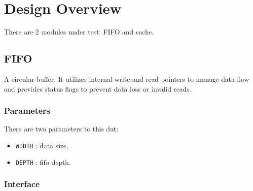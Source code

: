 \chapter{Design Overview} 
\label{cha:design_overview}

There are 2 modules under test: FIFO and cache.

\section{FIFO}

A circular buffer.
It utilizes internal write and read pointers to manage data flow and provides status flags to prevent data loss or invalid reads.

\subsection{Parameters}

There are two parameters to this dut:

\begin{itemize}
    \item \texttt{WIDTH} : data size.
    \item \texttt{DEPTH} : fifo depth.
\end{itemize}

\subsection{Interface}


